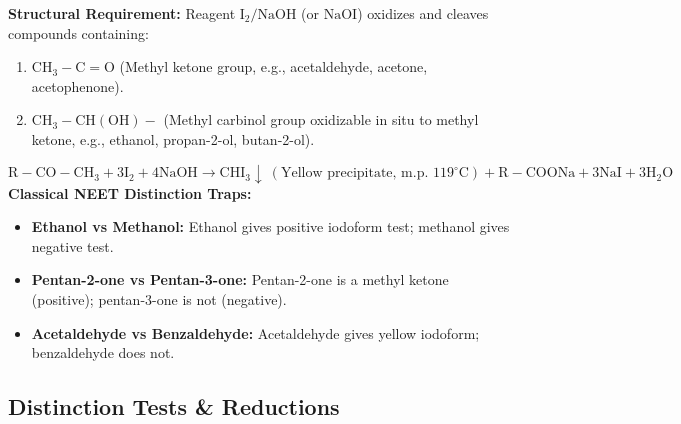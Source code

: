 \documentclass[10pt,a4paper]{article}
\begin{document}
\begin{trapbox}
\textbf{Structural Requirement:} Reagent $\mathrm{I_2 / NaOH}$ (or $\mathrm{NaOI}$) oxidizes and cleaves compounds containing:
\begin{enumerate}
  \item $\mathrm{CH_3-C=O}$ (Methyl ketone group, e.g., acetaldehyde, acetone, acetophenone).
  \item $\mathrm{CH_3-CH(OH)}-$ (Methyl carbinol group oxidizable in situ to methyl ketone, e.g., ethanol, propan-2-ol, butan-2-ol).
\end{enumerate}
\begin{equation}
  \mathrm{R-CO-CH_3} + 3\mathrm{I_2} + 4\mathrm{NaOH} \longrightarrow \mathbf{\mathrm{CHI_3}}\downarrow \ (\text{Yellow precipitate, m.p. } 119^\circ\text{C}) + \mathrm{R-COONa} + 3\mathrm{NaI} + 3\mathrm{H_2O}
\end{equation}
\textbf{Classical NEET Distinction Traps:}
\begin{itemize}
  \item \textbf{Ethanol vs Methanol:} Ethanol gives positive iodoform test; methanol gives negative test.
  \item \textbf{Pentan-2-one vs Pentan-3-one:} Pentan-2-one is a methyl ketone (positive); pentan-3-one is not (negative).
  \item \textbf{Acetaldehyde vs Benzaldehyde:} Acetaldehyde gives yellow iodoform; benzaldehyde does not.
\end{itemize}
\end{trapbox}

\subsection{Distinction Tests \& Reductions}
\end{document}
